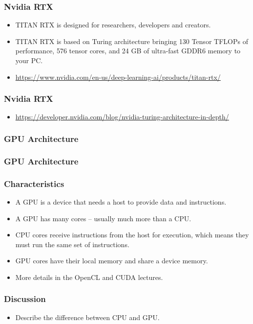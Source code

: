 \documentclass{beamer}
\begin{document}
\begin{CJK}{UTF8}{bsmi}
\begin{frame}
\frametitle{Nvidia RTX}
\begin{itemize}
\item TITAN RTX is designed for researchers, developers and creators.
\item TITAN RTX is based on Turing architecture bringing 130 Tensor TFLOPs of performance, 576 tensor cores, and 24 GB of ultra-fast GDDR6 memory to your PC.
\item \url{https://www.nvidia.com/en-us/deep-learning-ai/products/titan-rtx/}
\end{itemize}
\end{frame}


\begin{frame}
\frametitle{Nvidia RTX}
\begin{itemize}
\item \url{https://developer.nvidia.com/blog/nvidia-turing-architecture-in-depth/}
\end{itemize}
\end{frame}



\begin{frame}
\frametitle{GPU Architecture}
\centerline{}
\end{frame}


\begin{frame}
\frametitle{GPU Architecture}
\centerline{}
\end{frame}

\begin{frame}
\frametitle{Characteristics}
\begin{itemize}
\item A GPU is a device that needs a host to provide data and instructions.
\item A GPU has many cores -- usually much more than a CPU.
\item CPU cores receive instructions from the host for execution, which means they must run the same set of instructions.
\item  GPU cores have their local memory and share a device memory.
\item More details in the OpenCL and CUDA lectures.
\end{itemize}
\end{frame}


\begin{frame}
\frametitle{Discussion}
\begin{itemize}
\item Describe the difference between CPU and GPU.
\end{itemize}
\end{frame}



\end{CJK}
\end{document}
